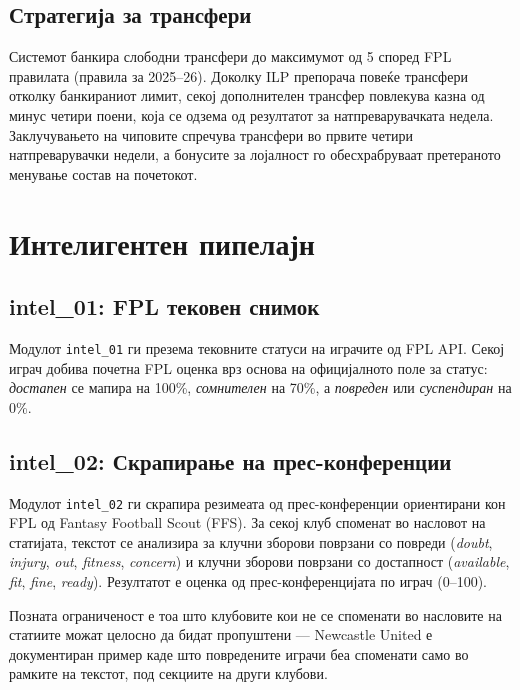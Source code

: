 \subsection{Стратегија за трансфери}

Системот банкира слободни трансфери до максимумот од 5 според FPL правилата (правила за 2025--26). Доколку ILP препорача повеќе трансфери отколку банкираниот лимит, секој дополнителен трансфер повлекува казна од минус четири поени, која се одзема од резултатот за натпреварувачката недела. Заклучувањето на чиповите спречува трансфери во првите четири натпреварувачки недели, а бонусите за лојалност го обесхрабруваат претераното менување состав на почетокот.

\section{Интелигентен пипелајн}

\subsection{intel\_01: FPL тековен снимок}

Модулот \texttt{intel\_01} ги презема тековните статуси на играчите од FPL API. Секој играч добива почетна FPL оценка врз основа на официјалното поле за статус: \textit{достапен} се мапира на 100\%, \textit{сомнителен} на 70\%, а \textit{повреден} или \textit{суспендиран} на 0\%.

\subsection{intel\_02: Скрапирање на прес-конференции}

Модулот \texttt{intel\_02} ги скрапира резимеата од прес-конференции ориентирани кон FPL од Fantasy Football Scout (FFS). За секој клуб споменат во насловот на статијата, текстот се анализира за клучни зборови поврзани со повреди (\textit{doubt}, \textit{injury}, \textit{out}, \textit{fitness}, \textit{concern}) и клучни зборови поврзани со достапност (\textit{available}, \textit{fit}, \textit{fine}, \textit{ready}). Резултатот е оценка од прес-конференцијата по играч (0--100).

Позната ограниченост е тоа што клубовите кои не се споменати во насловите на статиите можат целосно да бидат пропуштени — Newcastle United е документиран пример каде што повредените играчи беа споменати само во рамките на текстот, под секциите на други клубови.

